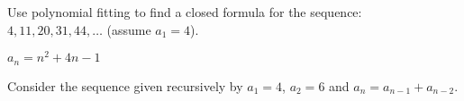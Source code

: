 \begin{questions}
%





\question Use polynomial fitting to find a closed formula for the sequence:
$4, 11, 20, 31, 44, \ldots $
(assume $a_1 = 4$).

	\begin{answer}
		$a_n = n^2 + 4n - 1$
	\end{answer}






\question Consider the sequence given recursively by $a_1 = 4$, $a_2 = 6$ and $a_n = a_{n-1} + a_{n-2}$.


\end{questions}

